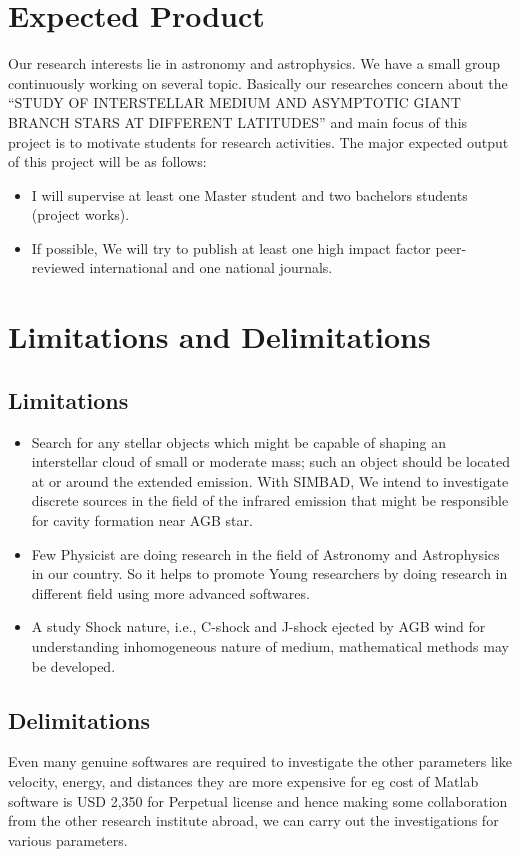 \documentclass[fleqn,a4paper,12pt,oneside]{article}
\begin{document}
\section{Expected Product}
Our  research interests lie in astronomy and astrophysics. We have a
small group continuously working on several topic. Basically our
researches concern about the ``STUDY OF INTERSTELLAR MEDIUM AND ASYMPTOTIC GIANT BRANCH STARS AT DIFFERENT LATITUDES'' and main focus of this project is to motivate students for research activities.
The major expected output of this project will be as follows:
\begin{itemize}
\item I will supervise at least one Master student and two bachelors students (project works).
\item If possible, We will  try to publish at  least one high impact factor peer-reviewed
international and one national journals.
\end{itemize}
\section{Limitations and Delimitations}
\subsection{Limitations}
\begin{itemize}
	\item Search for any stellar
	objects which might be capable of shaping an interstellar cloud of
	small or moderate mass; such an object should be located at or
	around the extended emission\cite{B_4}. With SIMBAD, We intend to
	investigate discrete sources in the field of the infrared emission
	that might be responsible for cavity formation near AGB star.
	\item Few Physicist are doing research in the field of Astronomy and Astrophysics in our country. So it helps to promote Young researchers by doing research in different field using more advanced softwares. 
	\item A study Shock nature, i.e., C-shock and J-shock ejected by AGB
	wind for understanding inhomogeneous nature of medium, mathematical methods may be developed.
\end{itemize}
\subsection{ Delimitations}

Even many genuine  softwares are required to investigate the other parameters like velocity, energy, and distances they are more  expensive for eg cost of Matlab software is  USD 2,350 for Perpetual license and hence making some collaboration from the other research institute abroad, we can carry out the investigations for various parameters.
\end{document}
